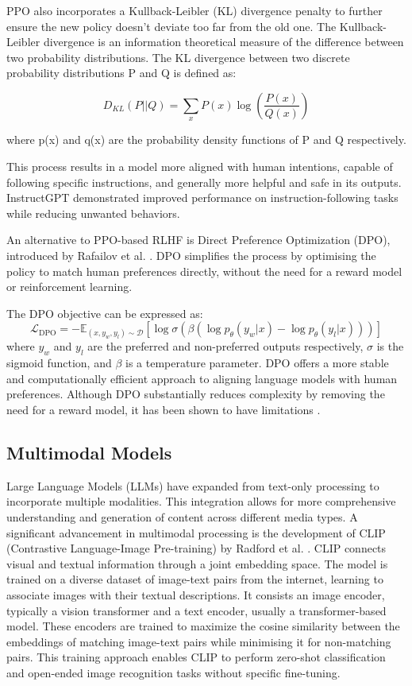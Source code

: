 \documentclass[a4paper, oneside]{discothesis}
\begin{document}
PPO also incorporates a Kullback-Leibler (KL) divergence penalty to further ensure the new policy doesn't deviate too far from the old one. The Kullback-Leibler divergence is an information theoretical measure of the difference between two probability distributions. The KL divergence between two discrete probability distributions P and Q is defined as:

\[D_{KL}(P||Q) = \sum_{x} P(x) \log\left(\frac{P(x)}{Q(x)}\right)\]

where p(x) and q(x) are the probability density functions of P and Q respectively.

This process results in a model more aligned with human intentions, capable of following specific instructions, and generally more helpful and safe in its outputs. InstructGPT demonstrated improved performance on instruction-following tasks while reducing unwanted behaviors.

An alternative to PPO-based RLHF is Direct Preference Optimization (DPO), introduced by Rafailov et al. \cite{rafailov2023direct}. 
DPO simplifies the process by optimising the policy to match human preferences directly, without the need for a reward model or reinforcement learning. 

The DPO objective can be expressed as:
\[\mathcal{L}_{\text{DPO}} = -\mathbb{E}_{(x,y_w,y_l)\sim \mathcal{D}}[\log \sigma(\beta(\log p_\theta(y_w|x) - \log p_\theta(y_l|x)))]\]
where $y_w$ and $y_l$ are the preferred and non-preferred outputs respectively, $\sigma$ is the sigmoid function, and $\beta$ is a temperature parameter. DPO offers a more stable and computationally efficient approach to aligning language models with human preferences. Although DPO substantially reduces complexity by removing the need for a reward model, it has been shown to have limitations \cite{dposuperiortoppo_xu}.


\subsection{Multimodal Models}
Large Language Models (LLMs) have expanded from text-only processing to incorporate multiple modalities. This integration allows for more comprehensive understanding and generation of content across different media types. A significant advancement in multimodal processing is the development of CLIP (Contrastive Language-Image Pre-training) by Radford et al. \cite{radford2021cliplearning}. CLIP connects visual and textual information through a joint embedding space. The model is trained on a diverse dataset of image-text pairs from the internet, learning to associate images with their textual descriptions. It consists an image encoder, typically a vision transformer and a text encoder, usually a transformer-based model. These encoders are trained to maximize the cosine similarity between the embeddings of matching image-text pairs while minimising it for non-matching pairs. This training approach enables CLIP to perform zero-shot classification and open-ended image recognition tasks without specific fine-tuning.
\end{document}
